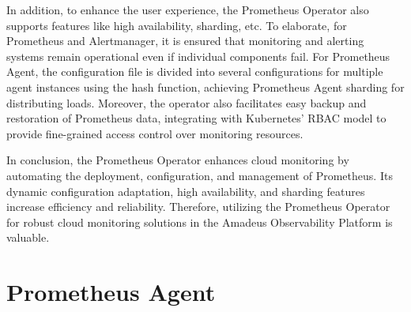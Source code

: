 In addition, to enhance the user experience, the Prometheus Operator also supports features like high availability, sharding, etc. To elaborate, for Prometheus and Alertmanager, it is ensured that monitoring and alerting systems remain operational even if individual components fail. For Prometheus Agent, the configuration file is divided into several configurations for multiple agent instances using the hash function, achieving Prometheus Agent sharding for distributing loads. Moreover, the operator also facilitates easy backup and restoration of Prometheus data, integrating with Kubernetes' RBAC model to provide fine-grained access control over monitoring resources. 

In conclusion, the Prometheus Operator enhances cloud monitoring by automating the deployment, configuration, and management of Prometheus. Its dynamic configuration adaptation, high availability, and sharding features increase efficiency and reliability. Therefore, utilizing the Prometheus Operator for robust cloud monitoring solutions in the Amadeus Observability Platform is valuable. 

\section{Prometheus Agent}

